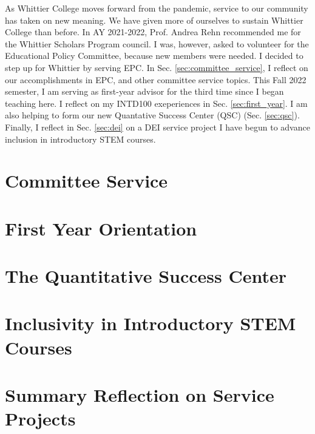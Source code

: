 \documentclass[../../main.tex]{subfiles}
\begin{document}
\label{sec:service}

As Whittier College moves forward from the pandemic, service to our community has taken on new meaning.  We have given more of ourselves to sustain Whittier College than before.  In AY 2021-2022, Prof. Andrea Rehn recommended me for the Whittier Scholars Program council.  I was, however, asked to volunteer for the Educational Policy Committee, because new members were needed.  I decided to step up for Whittier by serving EPC.  In Sec. \ref{sec:committee_service}, I reflect on our accomplishments in EPC, and other committee service topics.  This Fall 2022 semester, I am serving as first-year advisor for the third time since I began teaching here.  I reflect on my INTD100 exeperiences in Sec. \ref{sec:first_year}.  I am also helping to form our new Quantative Success Center (QSC) (Sec. \ref{sec:qsc}).  Finally, I reflect in Sec. \ref{sec:dei} on a DEI service project I have begun to advance inclusion in introductory STEM courses.

\section{Committee Service}

\begin{flushleft}

\end{flushleft}

\section{First Year Orientation}

\begin{flushleft}

\end{flushleft}

\section{The Quantitative Success Center}

\begin{flushleft}

\end{flushleft}

\section{Inclusivity in Introductory STEM Courses}

\begin{flushleft}

\end{flushleft}

\section{Summary Reflection on Service Projects}

\begin{flushleft}

\end{flushleft}
\end{document}
